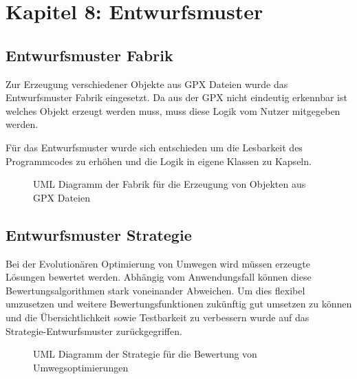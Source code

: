 \section{Kapitel 8: Entwurfsmuster}

\subsection{Entwurfsmuster Fabrik}

Zur Erzeugung verschiedener Objekte aus GPX Dateien wurde das Entwurfsmuster Fabrik eingesetzt. Da aus der GPX nicht eindeutig erkennbar ist welches Objekt erzeugt werden muss, muss diese Logik vom Nutzer mitgegeben werden.

Für das Entwurfsmuster wurde sich entschieden um die Lesbarkeit des Programmcodes zu erhöhen und die Logik in eigene Klassen zu Kapseln.

\begin{figure}[H]
  \centering
  
  \caption{UML Diagramm der Fabrik für die Erzeugung von Objekten aus GPX Dateien}
\end{figure}

\subsection{Entwurfsmuster Strategie}

Bei der Evolutionären Optimierung von Umwegen wird müssen erzeugte Lösungen bewertet werden. Abhängig vom Anwendungsfall können diese Bewertungsalgorithmen stark voneinander Abweichen.
Um dies flexibel umzusetzen und weitere Bewertungsfunktionen zukünftig gut umsetzen zu können und die Übersichtlichkeit sowie Testbarkeit zu verbessern wurde auf das Strategie-Entwurfsmuster zurückgegriffen.

\begin{figure}[H]
  \centering
  
  \caption{UML Diagramm der Strategie für die Bewertung von Umwegsoptimierungen}
\end{figure}